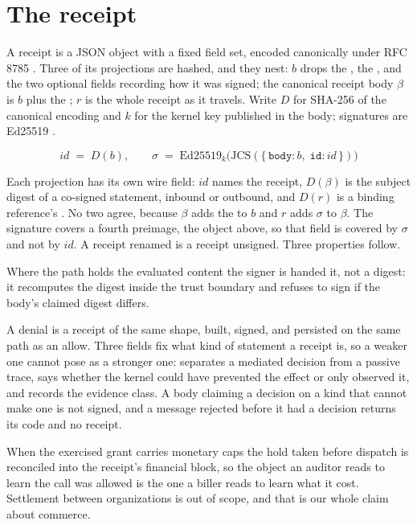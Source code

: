 \section{The receipt}
\label{sec:receipt}

A receipt is a JSON object with a fixed field set, encoded canonically under
RFC 8785 \cite{rfc8785}. Three of its projections are hashed, and they nest:
$b$ drops the , the , and the two optional fields
recording how it was signed; the canonical receipt body $\beta$ is $b$ plus the
; $r$ is the whole receipt as it travels. Write $D$ for SHA-256 of the
canonical encoding and $k$ for the kernel key published in the body; signatures
are Ed25519 \cite{rfc8032}.

\[
\mathit{id} \;=\; D(b),
\qquad
\sigma \;=\; \mathrm{Ed25519}_{k}\bigl(\mathrm{JCS}(\{\,\texttt{body}\!: b,\;
\texttt{id}\!: \mathit{id}\,\})\bigr)
\]

\noindent
Each projection has its own wire field: $\mathit{id}$ names the receipt,
$D(\beta)$ is the subject digest of a co-signed statement, inbound or outbound,
and $D(r)$ is a binding reference's . No two agree,
because $\beta$ adds the  to $b$ and $r$ adds $\sigma$ to $\beta$. The
signature covers a fourth preimage, the object above, so that field is covered
by $\sigma$ and not by $\mathit{id}$. A receipt renamed is a receipt unsigned.
Three properties follow.

 Where the path holds the evaluated content the
signer is handed it, not a digest: it recomputes the digest inside the trust
boundary and refuses to sign if the body's claimed digest differs.

 A denial is a receipt of the same shape, built,
signed, and persisted on the same path as an allow. Three fields fix what kind
of statement a receipt is, so a weaker one cannot pose as a stronger one:
 separates a mediated decision from a passive trace,
 says whether the kernel could have prevented the effect or
only observed it, and  records the evidence class. A body
claiming a decision on a kind that cannot make one is not signed, and a message
rejected before it had a decision returns its code and no receipt.

 When the exercised grant
carries monetary caps the hold taken before dispatch is reconciled into the
receipt's financial block, so the object an auditor reads to learn the call was
allowed is the one a biller reads to learn what it cost. Settlement between
organizations is out of scope, and that is our whole claim about commerce.

